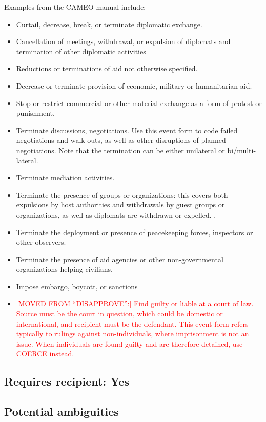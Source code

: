 \documentclass[11pt]{report}
\newcommand{\plcat}[1]{\textsf{#1}}
\newcommand{\andy}[1]{\textcolor{red}{#1}}
\begin{document}
Examples from the CAMEO manual include:

\begin{itemize}
\item Curtail, decrease, break, or terminate diplomatic exchange.

\item Cancellation of meetings, withdrawal, or expulsion of diplomats and termination of other diplomatic activities 

\item Reductions or terminations of aid not otherwise specified.
\item Decrease or terminate provision of economic, military or humanitarian aid.
\item Stop or restrict commercial or other material exchange as a form of protest or punishment.
\item Terminate discussions, negotiations. Use this event form to code failed negotiations and walk-outs, as well as other disruptions of planned negotiations. Note that the termination can be either unilateral or bi/multi-lateral.
\item Terminate mediation activities.
\item Terminate the presence of groups or organizations: this covers both expulsions by host authorities and withdrawals by guest groups or organizations, as well as diplomats are withdrawn or expelled. .   \item Terminate the deployment or presence of peacekeeping forces, inspectors or other observers.
\item Terminate the presence of aid agencies or other non-governmental organizations helping civilians.
\item  Impose embargo, boycott, or sanctions
\item \andy{[MOVED FROM ``DISAPPROVE'':] Find guilty or liable at a court of law. Source must be the court in question, which could be domestic or international, and recipient must be the defendant. This event form refers typically to rulings against non-individuals, where imprisonment is not an issue. When individuals are found guilty and are therefore detained, use \plcat{COERCE} instead.}
\end{itemize}

\subsection{Requires recipient: Yes}

\subsection{Potential ambiguities}
\end{document}
